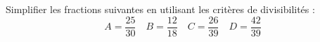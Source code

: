 
Simplifier les fractions suivantes en utilisant les critères de divisibilités :
 $$A=\frac{25}{30}  \quad B=\frac{12}{18}   \quad  C=\frac{26}{39}   \quad  D= \frac{42}{39}$$

